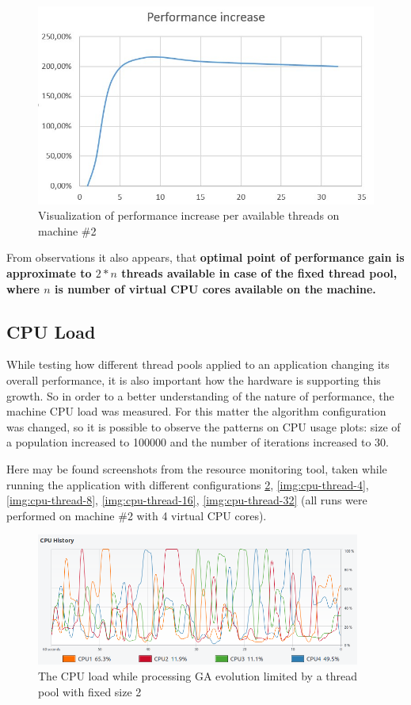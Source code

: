 \begin{figure}[h]
\centering\includegraphics[width=.8\textwidth]{img/exp/2/ubuntu-performance-increase}
\caption{Visualization of performance increase per available threads on machine \#2}  \label{img:ub-perf}
\end{figure}

From observations it also appears, that \textbf{optimal point of performance gain is approximate to \( 2 * n\) threads available in case of the fixed thread pool, where \(n\) is number of virtual CPU cores available on the machine.}

\subsection{CPU Load}

While testing how different thread pools applied to an application changing its overall performance, it is also important how the hardware is supporting this growth. So in order to a better understanding of the nature of performance, the machine CPU load was measured.
For this matter the algorithm configuration was changed, so it is possible to observe the patterns on CPU usage plots: size of a population increased to 100000 and the number of iterations increased to 30. 

Here may be found screenshots from the resource monitoring tool, taken while running the application with different configurations \ref{img:cpu-thread-2}, \ref{img:cpu-thread-4}, \ref{img:cpu-thread-8}, \ref{img:cpu-thread-16}, \ref{img:cpu-thread-32} (all runs were performed on machine \#2 with 4 virtual CPU cores).

\begin{figure}[h]
\centering\includegraphics[width=0.95\textwidth]{img/exp/2/limit-threadpool-2}
\caption{The CPU load while processing GA evolution limited by a thread pool with fixed size 2 }  \label{img:cpu-thread-2}
\end{figure}

